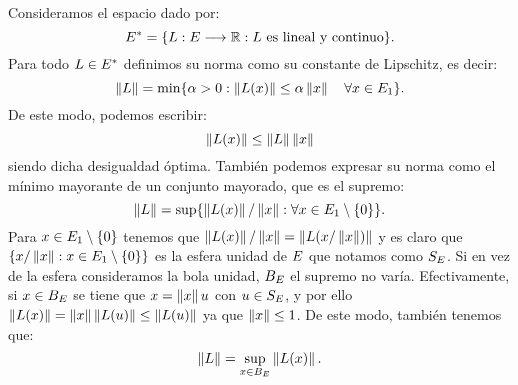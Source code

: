 Consideramos el espacio dado por:
\[
E^* =  \lbrace L:E \longrightarrow \mathbb{R}: L \text{ es lineal y continuo} \rbrace.
\]
Para todo $ L \in E^* $ definimos su norma como su constante de Lipschitz, es decir:
\[
\left\Vert L\right\Vert = \min \lbrace \alpha > 0:  \left\Vert L(x)\right\Vert \leq \alpha \left\Vert x\right\Vert \quad \forall x \in E_1\rbrace.
\]
De este modo, podemos escribir:
\begin{equation}\label{desigNorma}
	\left\Vert L(x)\right\Vert \leq \left\Vert L\right\Vert \left\Vert x\right\Vert
\end{equation}
siendo dicha desigualdad óptima. También podemos expresar su norma como el mínimo mayorante de un conjunto mayorado, que es el supremo:
\[
\left\Vert L\right\Vert = \sup \lbrace \left\Vert L(x)\right\Vert/\left\Vert x\right\Vert : \forall x \in E_1 \setminus \{0\}\rbrace.
\]
Para $  x \in E_1 \setminus \{0\} $ tenemos que $ \left\Vert L(x)\right\Vert/\left\Vert x\right\Vert = \left\Vert L(x/\left\Vert x\right\Vert)\right\Vert$ y es claro que $ \{ x/\left\Vert x\right\Vert : x \in E_1 \setminus \{0\}\} $ es la esfera unidad de $ E $ que notamos como $ S_E $. Si en vez de la esfera consideramos la bola unidad, $ B_E $ el supremo no varía. Efectivamente, si $ x \in B_E  $ se tiene que $ x = \left\Vert x\right\Vert u $ con $ u \in  S_E$, y por ello $ \left\Vert L(x)\right\Vert = \left\Vert x\right\Vert\left\Vert L(u)\right\Vert \leq \left\Vert L(u)\right\Vert $ ya que $ \left\Vert x\right\Vert \leq 1 $. De este modo, también tenemos que:
\begin{equation}\label{normSup}
	\left\Vert L\right\Vert =\sup_{x \in B_E} \left\Vert L(x)\right\Vert.
\end{equation}

